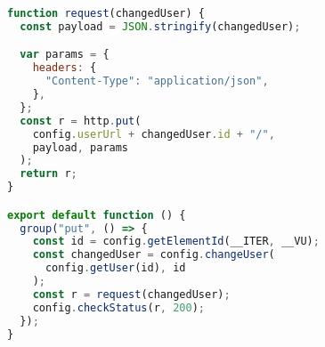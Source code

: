 \begin{lstlisting}[language=JavaScript,caption={K6 Put test},breaklines=true,label={lst:k6Put}]
function request(changedUser) {
  const payload = JSON.stringify(changedUser);

  var params = {
    headers: {
      "Content-Type": "application/json",
    },
  };
  const r = http.put(
    config.userUrl + changedUser.id + "/",
    payload, params
  );
  return r;
}

export default function () {
  group("put", () => {
    const id = config.getElementId(__ITER, __VU);
    const changedUser = config.changeUser(
      config.getUser(id), id
    );
    const r = request(changedUser);
    config.checkStatus(r, 200);
  });
}

\end{lstlisting}
